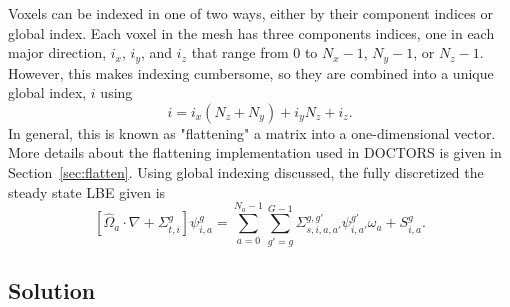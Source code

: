 Voxels can be indexed in one of two ways, either by their component indices or global index. Each voxel in the mesh has three components indices, one in each major direction, $i_x$, $i_y$, and $i_z$ that range from 0 to $N_x - 1$, $N_y - 1$, or $N_z-1$. However, this makes indexing cumbersome, so they are combined into a unique global index, $i$ using 
\begin{equation} \label{eq:indx_flat}
i = i_x (N_z + N_y) + i_y N_z + i_z.
\end{equation}
In general, this is known as "flattening" a matrix into a one-dimensional vector. More details about the flattening implementation used in DOCTORS is given in Section~\ref{sec:flatten}. Using global indexing discussed, the fully discretized the steady state LBE given is
\begin{equation} \label{eq:boltz_i}
\left[ \hat{\Omega}_a \cdot \nabla + \Sigma_{t,i}^g \right]
\psi_{i,a}^{g} = 
\sum_{a=0}^{N_a-1} \sum_{g'=g}^{G-1} \Sigma_{s, i, a, a'}^{g, g'} \psi_{i, a'}^{g'} \omega_a + S_{i,a}^g.
\end{equation}

\subsection{Solution}

